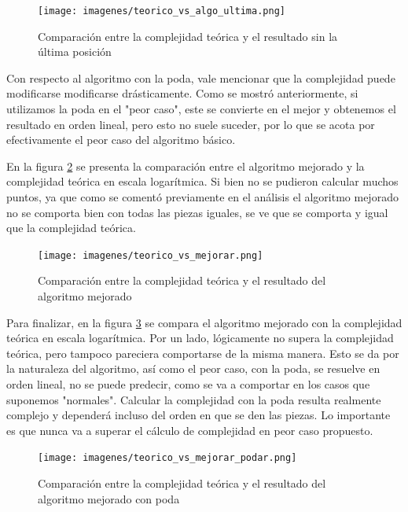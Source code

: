 \documentclass[11pt,a4paper]{article}
\begin{document}
	\begin{figure}[H]
    	\begin{center}
        	\texttt{[image: imagenes/teorico\_vs\_algo\_ultima.png]}
    	\end{center}
    	\caption{Comparación entre la complejidad teórica y el resultado sin la última posición}
    	\label{fig:teorico_vs_algo_ultima}
	\end{figure}


Con respecto al algoritmo con la poda, vale mencionar que la complejidad puede modificarse modificarse drásticamente. Como se mostró anteriormente, si utilizamos la poda en el "peor caso", este se convierte en el mejor y obtenemos el resultado en orden lineal, pero esto no suele suceder, por lo que se acota por efectivamente el peor caso del algoritmo básico.

En la figura \ref{fig:teorico_vs_mejorar} se presenta la comparación entre el algoritmo mejorado y la complejidad teórica en escala logarítmica. Si bien no se pudieron calcular muchos puntos, ya que como se comentó previamente en el análisis el algoritmo mejorado no se comporta bien con todas las piezas iguales, se ve que se comporta y igual que la complejidad teórica.

	\begin{figure}[H]
    	\begin{center}
        	\texttt{[image: imagenes/teorico\_vs\_mejorar.png]}
    	\end{center}
    	\caption{Comparación entre la complejidad teórica y el resultado del algoritmo mejorado}
    	\label{fig:teorico_vs_mejorar}
	\end{figure}


Para finalizar, en la figura \ref{fig:teorico_vs_mejorar_podar} se compara el algoritmo mejorado con la complejidad teórica en escala logarítmica. Por un lado, lógicamente no supera la complejidad teórica, pero tampoco pareciera comportarse de la misma manera. Esto se da por la naturaleza del algoritmo, así como el peor caso, con la poda, se resuelve en orden lineal, no se puede predecir, como se va a comportar en los casos que suponemos "normales". Calcular la complejidad con la poda resulta realmente complejo y dependerá incluso del orden en que se den las piezas. Lo importante es que nunca va a superar el cálculo de complejidad en peor caso propuesto.

	\begin{figure}[H]
    	\begin{center}
        	\texttt{[image: imagenes/teorico\_vs\_mejorar\_podar.png]}
    	\end{center}
    	\caption{Comparación entre la complejidad teórica y el resultado del algoritmo mejorado con poda}
    	\label{fig:teorico_vs_mejorar_podar}
	\end{figure}
\end{document}
